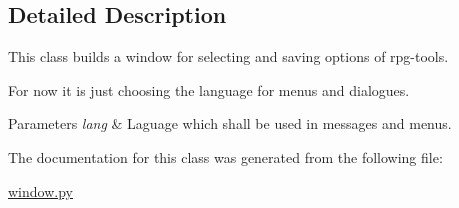 \subsection{Detailed Description}
This class builds a window for selecting and saving options of rpg-\/tools. 

For now it is just choosing the language for menus and dialogues. 
\begin{DoxyParams}{Parameters}
{\em lang} & Laguage which shall be used in messages and menus. \\
\hline
\end{DoxyParams}


The documentation for this class was generated from the following file\+:\begin{DoxyCompactItemize}
\item 
\hyperlink{window_8py}{window.\+py}\end{DoxyCompactItemize}

